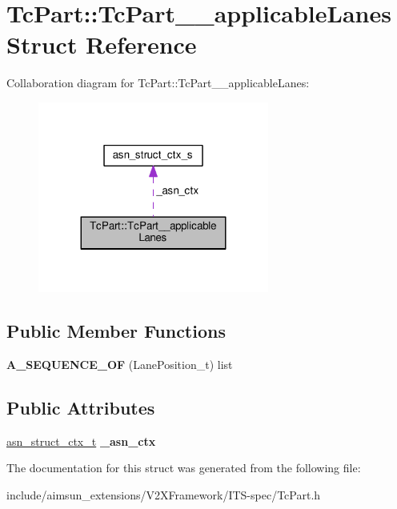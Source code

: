 \hypertarget{structTcPart_1_1TcPart____applicableLanes}{}\section{Tc\+Part\+:\+:Tc\+Part\+\_\+\+\_\+applicable\+Lanes Struct Reference}
\label{structTcPart_1_1TcPart____applicableLanes}


Collaboration diagram for Tc\+Part\+:\+:Tc\+Part\+\_\+\+\_\+applicable\+Lanes\+:\nopagebreak
\begin{figure}[H]
\begin{center}
\leavevmode
\includegraphics[width=215pt]{structTcPart_1_1TcPart____applicableLanes__coll__graph}
\end{center}
\end{figure}
\subsection*{Public Member Functions}
\begin{DoxyCompactItemize}
\item 
{\bfseries A\+\_\+\+S\+E\+Q\+U\+E\+N\+C\+E\+\_\+\+OF} (Lane\+Position\+\_\+t) list\hypertarget{structTcPart_1_1TcPart____applicableLanes_acfb8edbd353370316112b5277a1766f4}{}\label{structTcPart_1_1TcPart____applicableLanes_acfb8edbd353370316112b5277a1766f4}

\end{DoxyCompactItemize}
\subsection*{Public Attributes}
\begin{DoxyCompactItemize}
\item 
\hyperlink{structasn__struct__ctx__s}{asn\+\_\+struct\+\_\+ctx\+\_\+t} {\bfseries \+\_\+asn\+\_\+ctx}\hypertarget{structTcPart_1_1TcPart____applicableLanes_a0f2f2800bbac7eeef986cdefd786b274}{}\label{structTcPart_1_1TcPart____applicableLanes_a0f2f2800bbac7eeef986cdefd786b274}

\end{DoxyCompactItemize}


The documentation for this struct was generated from the following file\+:\begin{DoxyCompactItemize}
\item 
include/aimsun\+\_\+extensions/\+V2\+X\+Framework/\+I\+T\+S-\/spec/Tc\+Part.\+h\end{DoxyCompactItemize}
